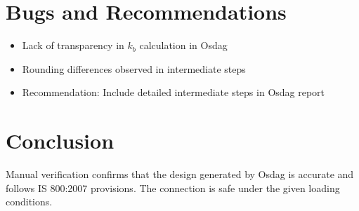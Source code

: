 \section{Bugs and Recommendations}
\begin{itemize}
    \item Lack of transparency in $k_b$ calculation in Osdag
    \item Rounding differences observed in intermediate steps
    \item Recommendation: Include detailed intermediate steps in Osdag report
\end{itemize}

\section{Conclusion}
Manual verification confirms that the design generated by Osdag is accurate and follows IS 800:2007 provisions. The connection is safe under the given loading conditions.

